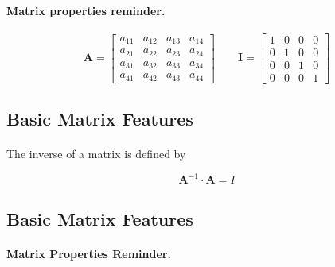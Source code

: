 \documentclass[%
oneside,                 %
final,                   %
10pt]{article}
\begin{document}
\paragraph{Matrix properties reminder.}
\[
 \mathbf{A} =
      \begin{bmatrix} a_{11} & a_{12} & a_{13} & a_{14} \\
                                 a_{21} & a_{22} & a_{23} & a_{24} \\
                                   a_{31} & a_{32} & a_{33} & a_{34} \\
                                  a_{41} & a_{42} & a_{43} & a_{44}
             \end{bmatrix}\qquad
\mathbf{I} =
      \begin{bmatrix} 1 & 0 & 0 & 0 \\
                                 0 & 1 & 0 & 0 \\
                                 0 & 0 & 1 & 0 \\
                                 0 & 0 & 0 & 1
             \end{bmatrix}
\]



\subsection{Basic Matrix Features}

\paragraph{}

The inverse of a matrix is defined by

\[
\mathbf{A}^{-1} \cdot \mathbf{A} = I
\]




\subsection{Basic Matrix Features}


\paragraph{Matrix Properties Reminder.}
\end{document}
